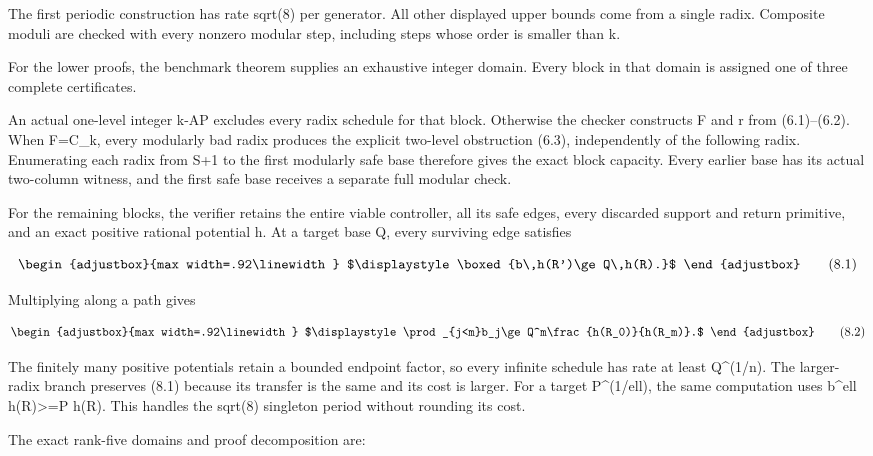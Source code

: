 The first periodic construction has rate sqrt(8) per generator. All other displayed upper bounds come from a single radix. Composite moduli are checked with every nonzero modular step, including steps whose order is smaller than k.

For the lower proofs, the benchmark theorem supplies an exhaustive integer domain. Every block in that domain is assigned one of three complete certificates.

An actual one-level integer k-AP excludes every radix schedule for that block. Otherwise the checker constructs F and r from (6.1)--(6.2). When F=C\_k, every modularly bad radix produces the explicit two-level obstruction (6.3), independently of the following radix. Enumerating each radix from S+1 to the first modularly safe base therefore gives the exact block capacity. Every earlier base has its actual two-column witness, and the first safe base receives a separate full modular check.

For the remaining blocks, the verifier retains the entire viable controller, all its safe edges, every discarded support and return primitive, and an exact positive rational potential h. At a target base Q, every surviving edge satisfies

\[
\begin{adjustbox}{max width=.92\linewidth}
$\displaystyle \boxed{b\,h(R')\ge Q\,h(R).}$
\end{adjustbox}
\tag{8.1}
\]

Multiplying along a path gives

\[
\begin{adjustbox}{max width=.92\linewidth}
$\displaystyle \prod_{j<m}b_j\ge Q^m\frac{h(R_0)}{h(R_m)}.$
\end{adjustbox}
\tag{8.2}
\]

The finitely many positive potentials retain a bounded endpoint factor, so every infinite schedule has rate at least Q\^{}(1/n). The larger-radix branch preserves (8.1) because its transfer is the same and its cost is larger. For a target P\^{}(1/ell), the same computation uses b\^{}ell h(R\textquotesingle)\textgreater=P h(R). This handles the sqrt(8) singleton period without rounding its cost.

The exact rank-five domains and proof decomposition are:

